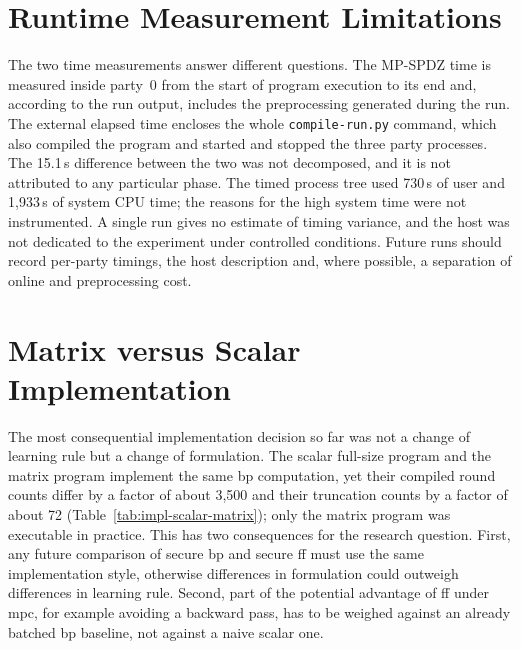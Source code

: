 \section{Runtime Measurement Limitations}\label{sec:disc-timing}
The two time measurements answer different questions. The MP-SPDZ time is measured inside party~0 from the start of program execution to its end and, according to the run output, includes the preprocessing generated during the run. The external elapsed time encloses the whole \texttt{compile-run.py} command, which also compiled the program and started and stopped the three party processes. The 15.1\,s difference between the two was not decomposed, and it is not attributed to any particular phase. The timed process tree used 730\,s of user and 1{,}933\,s of system CPU time; the reasons for the high system time were not instrumented. A single run gives no estimate of timing variance, and the host was not dedicated to the experiment under controlled conditions. Future runs should record per-party timings, the host description and, where possible, a separation of online and preprocessing cost.

\section{Matrix versus Scalar Implementation}\label{sec:disc-matrix}
The most consequential implementation decision so far was not a change of learning rule but a change of formulation. The scalar full-size program and the matrix program implement the same \ac{bp} computation, yet their compiled round counts differ by a factor of about 3{,}500 and their truncation counts by a factor of about 72 (Table~\ref{tab:impl-scalar-matrix}); only the matrix program was executable in practice. This has two consequences for the research question. First, any future comparison of secure \ac{bp} and secure \ac{ff} must use the same implementation style, otherwise differences in formulation could outweigh differences in learning rule. Second, part of the potential advantage of \ac{ff} under \ac{mpc}, for example avoiding a backward pass, has to be weighed against an already batched \ac{bp} baseline, not against a naive scalar one.

